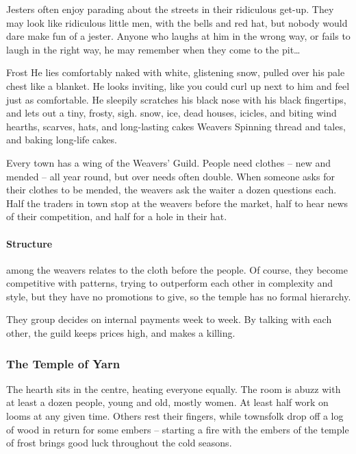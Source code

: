 \begin{multicols}{2}
Jesters often enjoy parading about the streets in their ridiculous get-up.
They may look like ridiculous little men, with the bells and red hat, but nobody would dare make fun of a jester.
Anyone who laughs at him in the wrong way, or fails to laugh in the right way, he may remember when they come to the pit\ldots

  {Frost}%
  {
    He lies comfortably naked with white, glistening snow, pulled over his pale chest like a blanket.
    He looks inviting, like you could curl up next to him and feel just as comfortable.
    He sleepily scratches his black nose with his black fingertips, and lets out a tiny, frosty, sigh.
  }%
  {snow, ice, dead houses, icicles, and biting wind}%
  {hearths, scarves, hats, and long-lasting cakes}%
  {Weavers}%
  {
    Spinning thread and tales, and baking long-life cakes.
  }%

Every town has a wing of the Weavers' Guild.
People need clothes -- new and mended -- all year round, but over needs often double.
When someone asks for their clothes to be mended, the weavers ask the waiter a dozen questions each.
Half the traders in town stop at the weavers before the market, half to hear news of their competition, and half for a hole in their hat.

\paragraph{Structure}
among the weavers relates to the cloth before the people.
Of course, they become competitive with patterns, trying to outperform each other in complexity and style, but they have no promotions to give, so the temple has no formal hierarchy.

They group decides on internal payments week to week.
By talking with each other, the guild keeps prices high, and makes a killing.

\subsubsection{The Temple of Yarn}

The hearth sits in the centre, heating everyone equally.
The room is abuzz with at least a dozen people, young and old, mostly women.
At least half work on looms at any given time.
Others rest their fingers, while townsfolk drop off a log of wood in return for some embers -- starting a fire with the embers of the temple of frost brings good luck throughout the cold seasons.



\end{multicols}
